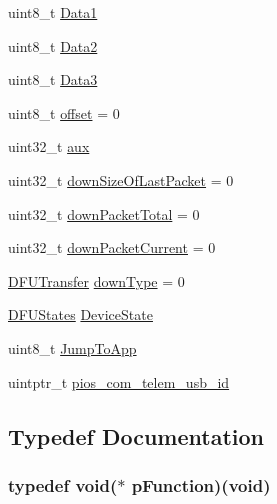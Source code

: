 \begin{DoxyCompactItemize}
\item 
uint8\-\_\-t \hyperlink{group___copter_control_b_l_ga15766c5ec55ae360109b7d9bef6999b5}{\-Data1}
\item 
uint8\-\_\-t \hyperlink{group___copter_control_b_l_gaf5f70ba2c733202d55d5ec7eda71995a}{\-Data2}
\item 
uint8\-\_\-t \hyperlink{group___copter_control_b_l_gad720a618b65381cfa7001818902cc1af}{\-Data3}
\item 
uint8\-\_\-t \hyperlink{group___copter_control_b_l_gaa9fff43968831437a312428836cab362}{offset} = 0
\item 
uint32\-\_\-t \hyperlink{group___copter_control_b_l_gac9bbabaf2ae72f5c475d939d06b3d9d1}{aux}
\item 
uint32\-\_\-t \hyperlink{group___copter_control_b_l_ga82229f66c307f3b4e51c7bd613d65eb4}{down\-Size\-Of\-Last\-Packet} = 0
\item 
uint32\-\_\-t \hyperlink{group___copter_control_b_l_gaa0f5e0ae7b6b9c1c7aa32e606fae3652}{down\-Packet\-Total} = 0
\item 
uint32\-\_\-t \hyperlink{group___copter_control_b_l_ga5125fe846a539f8e8a71d9a21a1b4d4d}{down\-Packet\-Current} = 0
\item 
\hyperlink{group___copter_control_b_l_ga0b23a3b03386f81782f1b57b69804064}{\-D\-F\-U\-Transfer} \hyperlink{group___copter_control_b_l_ga51d987c86e99fb64184b4b90a57ff360}{down\-Type} = 0
\item 
\hyperlink{group___copter_control_b_l_ga9a9e510f2da4e725074c7191d9d75d37}{\-D\-F\-U\-States} \hyperlink{group___copter_control_b_l_ga342208ed1954c6486eac389edf7c7f86}{\-Device\-State}
\item 
uint8\-\_\-t \hyperlink{group___copter_control_b_l_ga6c435d21e1e77b6e71943e6ecac43154}{\-Jump\-To\-App}
\item 
uintptr\-\_\-t \hyperlink{group___copter_control_b_l_ga513cc36d72b76de2fcb75ff233a79a4a}{pios\-\_\-com\-\_\-telem\-\_\-usb\-\_\-id}
\end{DoxyCompactItemize}


\subsection{\-Typedef \-Documentation}
\hypertarget{group___copter_control_b_l_ga9227bf1f1a9c633a0cc9ca50cc761c1a}{
\subsubsection[{p\-Function}]{\setlength{\rightskip}{0pt plus 5cm}typedef void($\ast$ {\bf p\-Function})(void)}}\label{group___copter_control_b_l_ga9227bf1f1a9c633a0cc9ca50cc761c1a}


